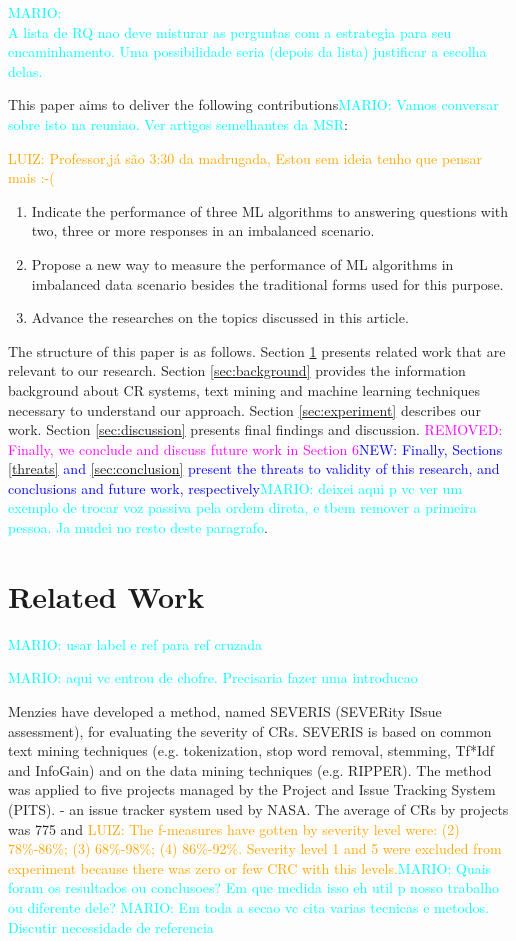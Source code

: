 \documentclass[10pt, conference]{IEEEtran}
\newcommand{\luiz}[1]{\noindent\textcolor{orange}{LUIZ: {#1}}}
\newcommand{\mario}[1]{\noindent\textcolor{cyan}{MARIO: {#1}}}
\newcommand{\rem}[1]{\noindent\textcolor{magenta}{REMOVED: {#1}}}
\newcommand{\new}[1]{\noindent\textcolor{blue}{NEW: {#1}}}
\newcommand{\luiz}[1]{}
\newcommand{\mario}[1]{}
\newcommand{\rem}[1]{}
\newcommand{\new}[1]{#1}
\begin{document}
\mario{\\ A lista de RQ nao deve misturar as perguntas com a estrategia para seu encaminhamento. Uma possibilidade seria (depois da lista) justificar a escolha delas.}

This paper aims to deliver the following contributions\mario{Vamos conversar sobre isto na reuniao. Ver artigos semelhantes da MSR}: 

\luiz{Professor,já são 3:30 da madrugada, Estou sem ideia tenho que pensar mais :-(}
\begin{enumerate}
  \item Indicate the performance of three ML algorithms to answering questions with two, three or more responses in an imbalanced scenario.  
  \item Propose a new way to measure the performance of ML algorithms in imbalanced data scenario besides the traditional forms used for this purpose.
  \item Advance the researches on the topics discussed in this article.
\end{enumerate}

The structure of this paper is as follows. Section \ref{sec:relatedwork} presents related work that are relevant to our research. Section \ref{sec:background} provides the information background about CR systems, text mining and machine learning techniques necessary to understand our approach. Section \ref{sec:experiment} describes our work. Section \ref{sec:discussion} presents final findings and discussion. \rem{Finally, we conclude and discuss future work in Section 6}\new{Finally, Sections \ref{threats} and \ref{sec:conclusion} present the threats to validity of this research, and conclusions and  future work, respectively}\mario{deixei aqui p vc ver um exemplo de trocar voz passiva pela ordem direta, e tbem remover a primeira pessoa. Ja mudei no resto deste paragrafo}.


\section{Related Work}\label{sec:relatedwork} \mario{usar label e ref para ref cruzada}

\mario{aqui vc entrou de chofre. Precisaria fazer uma introducao}

Menzies\cite{Menzies2008} have developed a method, named SEVERIS (SEVERity ISsue assessment), for evaluating the severity of CRs. SEVERIS is based on common text mining techniques (e.g. tokenization, stop word removal, stemming, Tf*Idf and InfoGain) and on the data mining techniques (e.g. RIPPER). The method was applied to five projects managed by the Project and Issue Tracking System (PITS). - an issue tracker system used by NASA. The average of CRs by projects was 775 and \luiz{The f-measures have gotten by severity level were: (2) 78\%-86\%; (3) 68\%-98\%; (4) 86\%-92\%. Severity level 1 and 5 were excluded from experiment because there was zero or few CRC with this levels.}\mario{Quais foram os resultados ou conclusoes? Em que medida isso eh util p nosso trabalho ou diferente dele?} \mario{Em toda a secao vc cita varias tecnicas e metodos. Discutir necessidade de referencia}
\end{document}
